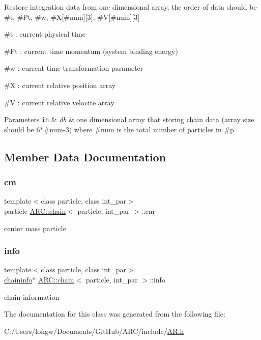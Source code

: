Restore integration data from one dimensional array, the order of data should be \#t, \#\+Pt, \#w, \#X\mbox{[}\#num\mbox{]}\mbox{[}3\mbox{]}, \#V\mbox{[}\#num\mbox{]}\mbox{[}3\mbox{]}
\begin{DoxyItemize}
\item \#t \+: current physical time
\item \#\+Pt \+: current time momentum (system binding energy)
\item \#w \+: current time transformation parameter
\item \#X \+: current relative position array
\item \#V \+: current relative velocite array 
\begin{DoxyParams}[1]{Parameters}
\mbox{\tt in}  & {\em db} & one dimensional array that storing chain data (array size should be 6$\ast$\#num-\/3) where \#num is the total number of particles in \#p \\
\hline
\end{DoxyParams}

\end{DoxyItemize}

\subsection{Member Data Documentation}
\hypertarget{classARC_1_1chain_a2eead75bd916fa7ffc05341645527847}{}\label{classARC_1_1chain_a2eead75bd916fa7ffc05341645527847} 
\subsubsection{\texorpdfstring{cm}{cm}}
{\footnotesize\ttfamily template$<$class particle, class int\+\_\+par$>$ \\
particle \hyperlink{classARC_1_1chain}{A\+R\+C\+::chain}$<$ particle, int\+\_\+par $>$\+::cm}



center mass particle 

\hypertarget{classARC_1_1chain_a7ad20a60e038d16522c11d7fccb47648}{}\label{classARC_1_1chain_a7ad20a60e038d16522c11d7fccb47648} 
\subsubsection{\texorpdfstring{info}{info}}
{\footnotesize\ttfamily template$<$class particle, class int\+\_\+par$>$ \\
\hyperlink{classARC_1_1chaininfo}{chaininfo}$\ast$ \hyperlink{classARC_1_1chain}{A\+R\+C\+::chain}$<$ particle, int\+\_\+par $>$\+::info}



chain information 



The documentation for this class was generated from the following file\+:\begin{DoxyCompactItemize}
\item 
C\+:/\+Users/longw/\+Documents/\+Git\+Hub/\+A\+R\+C/include/\hyperlink{AR_8h}{A\+R.\+h}\end{DoxyCompactItemize}
